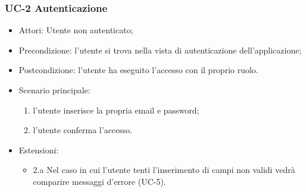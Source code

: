 \subsubsection{UC-2 Autenticazione}
		\begin{itemize}
			\item Attori: Utente non autenticato;
			\item Precondizione: l'utente si trova nella vista di autenticazione dell'applicazione;
			\item Postcondizione: l'utente ha eseguito l'accesso con il proprio ruolo.
			\item Scenario principale:
				\begin{enumerate}
					\item l'utente inserisce la propria email e password;
					\item l'utente conferma l'accesso.
				\end{enumerate}
				\item Estensioni:
				\begin{itemize}
					\item 2.a Nel caso in cui l'utente tenti l'inserimento di campi non validi vedrà comparire messaggi d'errore (UC-5).
				\end{itemize}
		\end{itemize}
		
